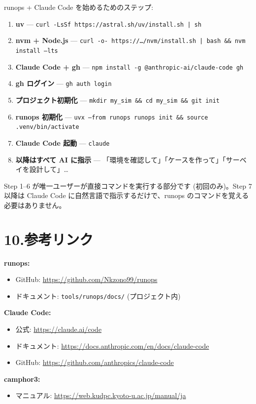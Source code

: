 \documentclass[a4paper,11pt]{article}
\newenvironment{infobox}{%
  \medskip\noindent
  \fboxrule=0.5pt\fboxsep=8pt
  \fcolorbox{infoframe}{infobg}\bgroup\minipage{\dimexpr\linewidth-2\fboxsep-2\fboxrule}
}{%
  \endminipage\egroup\medskip
}
\begin{document}
runops + Claude Code を始めるためのステップ:

\begin{enumerate}[nosep]
  \item \textbf{uv} --- \texttt{curl -LsSf https://astral.sh/uv/install.sh | sh}
  \item \textbf{nvm + Node.js} --- \texttt{curl -o- https://\ldots/nvm/install.sh | bash \&\& nvm install --lts}
  \item \textbf{Claude Code + gh} --- \texttt{npm install -g @anthropic-ai/claude-code gh}
  \item \textbf{gh ログイン} --- \texttt{gh auth login}
  \item \textbf{プロジェクト初期化} --- \texttt{mkdir my\_sim \&\& cd my\_sim \&\& git init}
  \item \textbf{runops 初期化} --- \texttt{uvx --from runops runops init \&\& source .venv/bin/activate}
  \item \textbf{Claude Code 起動} --- \texttt{claude}
  \item \textbf{以降はすべて AI に指示} --- 「環境を確認して」「ケースを作って」「サーベイを設計して」\ldots{}
\end{enumerate}

\begin{infobox}
Step 1--6 が唯一ユーザーが直接コマンドを実行する部分です (初回のみ)。Step 7 以降は Claude Code に自然言語で指示するだけで、runops のコマンドを覚える必要はありません。
\end{infobox}

\section*{\color{darkblue} 10.\quad 参考リンク}

\textbf{runops:}
\begin{itemize}[nosep]
  \item GitHub: \url{https://github.com/Nkzono99/runops}
  \item ドキュメント: \texttt{tools/runops/docs/} (プロジェクト内)
\end{itemize}

\textbf{Claude Code:}
\begin{itemize}[nosep]
  \item 公式: \url{https://claude.ai/code}
  \item ドキュメント: \url{https://docs.anthropic.com/en/docs/claude-code}
  \item GitHub: \url{https://github.com/anthropics/claude-code}
\end{itemize}

\textbf{camphor3:}
\begin{itemize}[nosep]
  \item マニュアル: \url{https://web.kudpc.kyoto-u.ac.jp/manual/ja}
\end{itemize}
\end{document}

